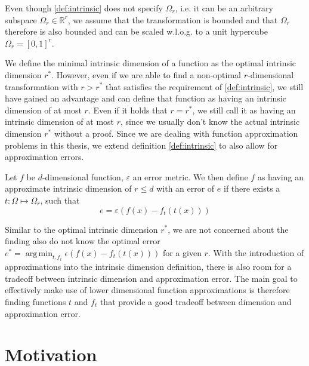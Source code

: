 \documentclass[
  a4paper,  %
  twoside,  %
  bibliography=totoc,
  headsepline,
  cleardoublepage=empty,
  parskip=half,
  draft=false
]{scrbook}
\DeclareMathOperator*{\argmin}{arg\,min}
\begin{document}
Even though \cref{def:intrinsic} does not specify $\Omega_r$, i.e. it can be an arbitrary subspace $\Omega_r \in \mathds{R}^r$, we assume that the transformation is bounded and that $\Omega_r$ therefore is also bounded and can be  scaled w.l.o.g. to a unit hypercube $\Omega_r=[0,1]^r$.

We define the minimal intrinsic dimension of a function as the optimal intrinsic dimension $r^\ast$.
However, even if we are able to find a non-optimal $r$-dimensional transformation with $r > r^\ast$ that satisfies the requirement of \cref{def:intrinsic}, we still have gained an advantage and can define that function as having an intrinsic dimension of at most $r$.
Even if it holds that $r=r^\ast$, we still call it as having an intrinsic dimension of at most $r$, since we usually don't know the actual intrinsic dimension $r^\ast$ without a proof.
Since we are dealing with function approximation problems in this thesis, we extend definition \cref{def:intrinsic} to also allow for approximation errors.

\begin{definition}
Let $f$ be $d$-dimensional function, $\varepsilon$ an error metric.
We then define $f$ as having an approximate intrinsic dimension of $r \leq d$ with an error of $e$ if there exists a $t \colon \Omega \mapsto \Omega_r$, such that
\begin{equation}
e=\varepsilon\left(f(x) - f_t(t(x))\right)
\end{equation}
\end{definition}

Similar to the optimal intrinsic dimension $r^\ast$, we are not concerned about the finding also do not know the optimal error $e^\ast= \argmin_{t, f_t} \epsilon(f(x) - f_t(t(x)))$ for a given $r$.
With the introduction of approximations into the intrinsic dimension definition, there is also room for a tradeoff between  intrinsic dimension and approximation error.
The main goal to effectively make use of lower dimensional function approximations is therefore finding functions $t$ and $f_t$ that provide a good tradeoff between dimension and approximation error.

\section{Motivation}
\end{document}
